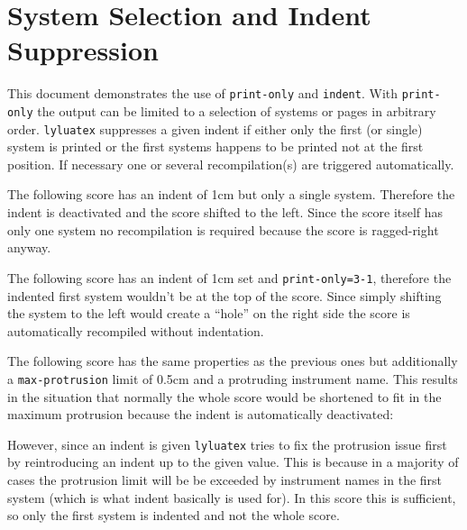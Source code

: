 \documentclass{scrartcl}
\begin{document}
\section*{System Selection and Indent Suppression}

This document demonstrates the use of \texttt{print-only} and \texttt{indent}.
With \texttt{print-only} the output can be limited to a selection of systems or
pages in arbitrary order.  \texttt{lyluatex} suppresses a given indent if either
only the first (or single) system is printed or the first systems happens to be
printed not at the first position.  If necessary one or several recompilation(s)
are triggered automatically.

\bigskip The following score has an indent of 1cm but only a single system.
Therefore the indent is deactivated and the score shifted to the left.  Since
the score itself has only one system no recompilation is required because the
score is ragged-right anyway.


The following score has an indent of 1cm set and \texttt{print-only=3-1},
therefore the indented first system wouldn't be at the top of the score. Since
simply shifting the system to the left would create a “hole” on the right side
the score is automatically recompiled without indentation.


The following score has the same properties as the previous ones but
additionally a \texttt{max-protrusion} limit of 0.5cm and a protruding
instrument name.  This results in the situation that normally the whole score
would be shortened to fit in the maximum protrusion because the indent is
automatically deactivated:


However, since an indent is given \texttt{lyluatex} tries to fix the protrusion
issue first by reintroducing an indent up to the given value.  This is because
in a majority of cases the protrusion limit will be be exceeded by instrument
names in the first system (which is what indent basically is used for).  In
this score this is sufficient, so only the first system is indented and not the
whole score.
\end{document}
